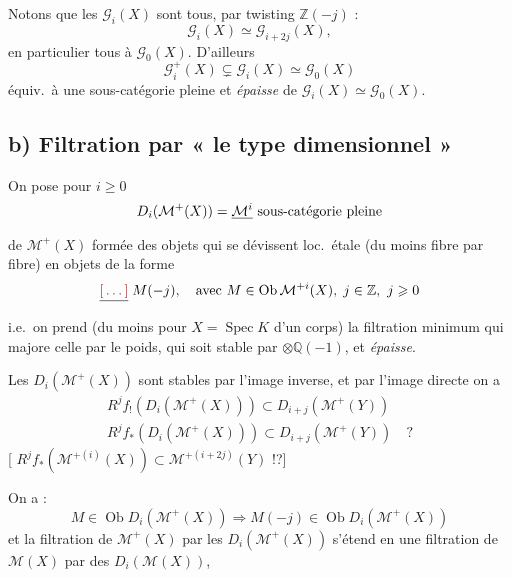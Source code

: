 \documentclass[11pt,a4paper]{article}
\begin{document}
Notons que les $\mathcal{G}_{i}(X)$ sont tous,   par twisting $\mathbb{Z}(-j)$ :
\[
  \mathcal{G}_{i}(X) \simeq \mathcal{G}_{i+2j}(X) ,
\]
en particulier tous  \struck{\ill{}} à $\mathcal{G}_{0}(X)$.
D'ailleurs
\[
  \mathcal{G}^{+}_{i}(X) \subsetneq \mathcal{G}_{i}(X) \simeq \mathcal{G}_{0}(X)
\]
équiv.\ à une sous-catégorie pleine et \emph{épaisse} de
$\mathcal{G}_{i}(X) \simeq \mathcal{G}_{0}(X)$.

\subsection{b) Filtration par « le  type dimensionnel »}

On pose pour $i \geqslant 0$
\[
  D_{i}(\mathcal{M}^{+}(X)) = \struck{\mathcal{M}^{i}} \text{ sous-catégorie pleine}
\]
de $\mathcal{M}^{+}(X)$ formée des objets qui se dévissent loc.\ étale (du moins fibre par
fibre) en objets de la forme
\[
  \struck{\ill{}} \; M(-j), \quad \text{avec } M \in \operatorname{Ob} \mathcal{M}^{+i}(X), \; j \in \mathbb{Z},\ j \geqslant 0
\]
i.e.\ on prend (du moins pour $X = \operatorname{Spec} K$ d'un corps) la filtration minimum qui majore celle par le poids,
\struck{\ill{}} qui soit stable par $\otimes \mathbb{Q}(-1)$, et
\emph{épaisse}.
\marginal{\ill{}}

Les $D_{i}(\mathcal{M}^{+}(X))$ sont stables par l'image inverse, et par
l'image directe on a
\[
  \begin{array}{l}
    R^{j}f_{!}(D_{i}(\mathcal{M}^{+}(X))) \subset D_{i+j}(\mathcal{M}^{+}(Y)) \\
    R^{j}f_{*}(D_{i}(\mathcal{M}^{+}(X))) \subset D_{i+j}(\mathcal{M}^{+}(Y)) \quad \text{?}
  \end{array}
\]
[
$R^{j}f_{*}(\mathcal{M}^{+(i)}(X)) \subset \mathcal{M}^{+(i+2j)}(Y)$ !?]

On \struck{\ill{}} a :
\[
  M \in \operatorname{Ob} D_{i}(\mathcal{M}^{+}(X)) \Longrightarrow
  M(-j) \in \operatorname{Ob} D_{i}(\mathcal{M}^{+}(X))
\]
et la filtration de $\mathcal{M}^{+}(X)$ par les $D_{i}(\mathcal{M}^{+}(X))$
s'étend en une filtration de $\mathcal{M}(X)$ par des $D_{i}(\mathcal{M}(X))$,
\end{document}
